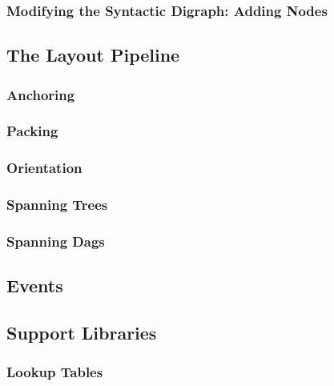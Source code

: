 \subsubsection{Modifying the Syntactic Digraph: Adding Nodes}



\subsection{The Layout Pipeline}

\label{section-gd-layout-pipeline}

\subsubsection{Anchoring}

\subsubsection{Packing}

\subsubsection{Orientation}

\subsubsection{Spanning Trees}

\subsubsection{Spanning Dags}


\subsection{Events}

\label{section-gd-events}

\subsection{Support Libraries}

\label{section-gd-libs}

\subsubsection{Lookup Tables}


